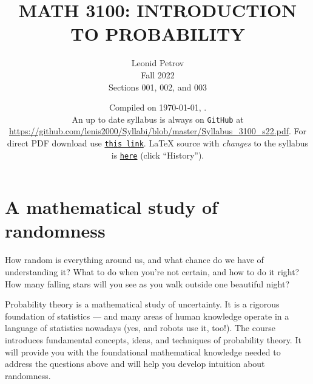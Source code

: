 \documentclass[oneside,11pt]{amsart}
\begin{document}
\title[MATH 3100: INTRODUCTION TO PROBABILITY]{MATH 3100: INTRODUCTION TO PROBABILITY}
\author{Leonid Petrov\\Fall 2022\\Sections 001, 002, and 003}
\date{Compiled on \today, \currenttime.\\An up to date syllabus is always on \texttt{GitHub} at \url{https://github.com/lenis2000/Syllabi/blob/master/Syllabus_3100_s22.pdf}. For direct PDF download use \href{https://github.com/lenis2000/Syllabi/raw/master/Syllabus_3100_s22.pdf}{\texttt{this link}}.
	\LaTeX{} source with \textit{changes} to the syllabus is \href{https://github.com/lenis2000/Syllabi/blob/master/Syllabus_3100_s22.tex}{\texttt{here}}
(click ``History'').}
\maketitle

\bigskip

\section{A mathematical study of randomness}

How random is everything around us, and what chance do we have of understanding it? What to do when you're not certain, and how to do it right? How many falling stars will you see as you walk outside one beautiful night? 

Probability theory is a mathematical study of uncertainty. It is a rigorous foundation of statistics --- and many areas of human knowledge operate in a language of statistics nowadays (yes, and robots use it, too!). The course introduces fundamental concepts, ideas, and techniques of probability theory. It will provide you with the foundational mathematical knowledge needed to address the questions above and will help you develop intuition about randomness.
\end{document}
